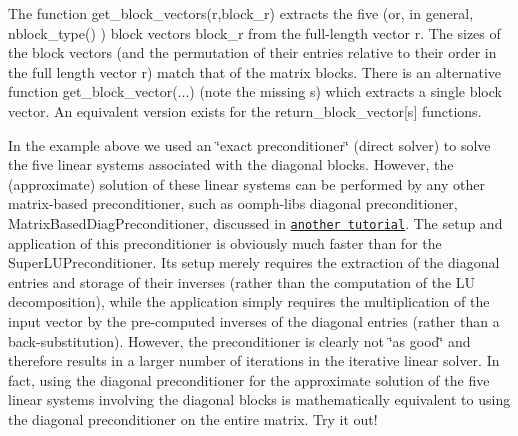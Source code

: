 \begin{DoxyItemize}
\item {\ttfamily The} function {\ttfamily get\+\_\+block\+\_\+vectors(r,block\+\_\+r)} extracts the five (or, in general, {\ttfamily nblock\+\_\+type()} ) block vectors {\ttfamily block\+\_\+r} from the full-\/length vector {\ttfamily r}. The sizes of the block vectors (and the permutation of their entries relative to their order in the full length vector {\ttfamily r}) match that of the matrix blocks. There is an alternative function {\ttfamily get\+\_\+block\+\_\+vector}(...) (note the missing s) which extracts a single block vector. An equivalent version exists for the {\ttfamily return\+\_\+block\+\_\+vector}\mbox{[}s\mbox{]} functions.
\item In the example above we used an \char`\"{}exact preconditioner\char`\"{} (direct solver) to solve the five linear systems associated with the diagonal blocks. However, the (approximate) solution of these linear systems can be performed by any other matrix-\/based preconditioner, such as {\ttfamily oomph-\/lib\textquotesingle{}s} diagonal preconditioner, {\ttfamily Matrix\+Based\+Diag\+Preconditioner}, discussed in \href{../../../linear_solvers/html/index.html}{\tt another tutorial}. The setup and application of this preconditioner is obviously much faster than for the {\ttfamily Super\+L\+U\+Preconditioner}. Its setup merely requires the extraction of the diagonal entries and storage of their inverses (rather than the computation of the LU decomposition), while the application simply requires the multiplication of the input vector by the pre-\/computed inverses of the diagonal entries (rather than a back-\/substitution). However, the preconditioner is clearly not \char`\"{}as good\char`\"{} and therefore results in a larger number of iterations in the iterative linear solver. In fact, using the diagonal preconditioner for the approximate solution of the five linear systems involving the diagonal blocks is mathematically equivalent to using the diagonal preconditioner on the entire matrix. Try it out!
\end{DoxyItemize}



 

